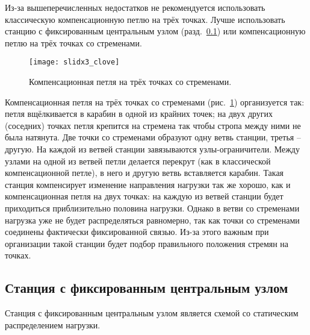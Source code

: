 \documentclass[fleqn, 12pt]{extarticle}
\begin{document}
    Из-за вышеперечисленных недостатков не рекомендуется использовать классическую компенсационную петлю на трёх точках. Лучше использовать станцию с фиксированным центральным узлом
    (разд.~\ref{sec:cordelette}) или компенсационную петлю на трёх точках со стременами.
    \begin{figure}[h]
        \centering
        \texttt{[image: slidx3\_clove]}
        \caption{Компенсационная петля на трёх точках со стременами.}\label{fig:slidx3_clove}
    \end{figure}
    
    Компенсационная петля на трёх точках со стременами (рис.~\ref{fig:slidx3_clove}) организуется так: петля вщёлкивается в карабин в одной из крайних точек; 
    на двух других (соседних) точках петля крепится на стремена
    так чтобы стропа между ними не была натянута. Две точки со стременами образуют одну ветвь станции, третья -- другую. На каждой из ветвей станции завязываются узлы-ограничители.
    Между узлами на одной из ветвей петли делается перекрут
    (как в классической компенсационной петле), в него и другую ветвь вставляется карабин.
    Такая станция компенсирует изменение направления нагрузки так же хорошо,
    как и компенсационная петля на двух точках: на каждую из ветвей станции будет приходиться приблизительно половина нагрузки. Однако в ветви со стременами нагрузка уже не будет
    распределяться равномерно, так как точки со стременами соединены фактически фиксированной связью. Из-за этого важным при организации такой станции будет подбор правильного
    положения стремян на точках.

\subsection{Станция с фиксированным центральным узлом}\label{sec:cordelette}
    Станция с фиксированным центральным узлом является схемой со статическим распределением нагрузки.
\end{document}
